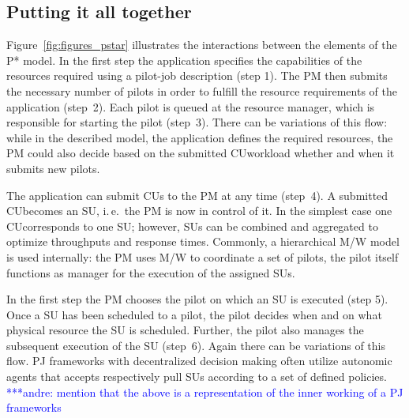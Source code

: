 \documentclass[conference,final]{IEEEtran}
\newcommand{\alnote}[1]{ {\textcolor{blue} { ***andre: #1 }}}
\newcommand{\alnote}[1]{}
\newcommand{\cu}{CU}
\begin{document}
\subsection{Putting it all together} 
Figure~\ref{fig:figures_pstar}
illustrates the interactions between the elements of the P* model. In
the first step the application specifies the capabilities of the
resources required using a pilot-job description (step 1). The PM then
submits the necessary number of pilots in order to fulfill the
resource requirements of the application (step~2). Each pilot is
queued at the resource manager, which is responsible for starting the
pilot (step~3). There can be variations of this flow: while in the
described model, the application defines the required resources, the
PM could also decide based on the submitted \cu  workload whether and
when it submits new pilots.

The application can submit \cu s to the PM at any time (step~4). A
submitted \cu  becomes an SU, i.\,e.\ the PM is now in control of it. In
the simplest case one \cu  corresponds to one SU; however, SUs can be
combined and aggregated to optimize throughputs and response
times. Commonly, a hierarchical M/W model is used internally: the PM
uses M/W to coordinate a set of pilots, the pilot itself functions as
manager for the execution of the assigned SUs.

In the first step the PM chooses the pilot on which an SU is executed
(step 5). Once a SU has been scheduled to a pilot, the pilot decides
when and on what physical resource the SU is scheduled. Further, the
pilot also manages the subsequent execution of the SU (step~6).  Again
there can be variations of this flow. PJ frameworks with decentralized
decision making often utilize autonomic agents that accepts
respectively pull SUs according to a set of defined policies.
\alnote{mention that the above is a representation of the inner working of a PJ
frameworks}
\end{document}
